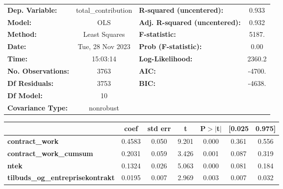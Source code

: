 \begin{center}
\begin{tabular}{lclc}
\toprule
\textbf{Dep. Variable:}                  & total\_contribution & \textbf{  R-squared (uncentered):}      &     0.933   \\
\textbf{Model:}                          &         OLS         & \textbf{  Adj. R-squared (uncentered):} &     0.932   \\
\textbf{Method:}                         &    Least Squares    & \textbf{  F-statistic:       }          &     5187.   \\
\textbf{Date:}                           &   Tue, 28 Nov 2023  & \textbf{  Prob (F-statistic):}          &     0.00    \\
\textbf{Time:}                           &       15:03:14      & \textbf{  Log-Likelihood:    }          &    2360.2   \\
\textbf{No. Observations:}               &          3763       & \textbf{  AIC:               }          &    -4700.   \\
\textbf{Df Residuals:}                   &          3753       & \textbf{  BIC:               }          &    -4638.   \\
\textbf{Df Model:}                       &            10       & \textbf{                     }          &             \\
\textbf{Covariance Type:}                &      nonrobust      & \textbf{                     }          &             \\
\bottomrule
\end{tabular}
\begin{tabular}{lcccccc}
                                         & \textbf{coef} & \textbf{std err} & \textbf{t} & \textbf{P$> |$t$|$} & \textbf{[0.025} & \textbf{0.975]}  \\
\midrule
\textbf{contract\_work}                  &       0.4583  &        0.050     &     9.201  &         0.000        &        0.361    &        0.556     \\
\textbf{contract\_work\_cumsum}          &       0.2031  &        0.059     &     3.426  &         0.001        &        0.087    &        0.319     \\
\textbf{ntek}                            &       0.1324  &        0.026     &     5.063  &         0.000        &        0.081    &        0.184     \\
\textbf{tilbuds\_og\_entreprisekontrakt} &       0.0195  &        0.007     &     2.969  &         0.003        &        0.007    &        0.032     \\

\end{tabular}
\end{center}
